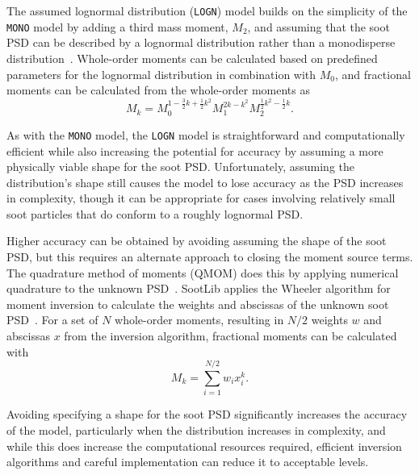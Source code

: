 \documentclass[preprint,letterpaper]{elsarticle}
\begin{document}

The assumed lognormal distribution (\texttt{LOGN}) model builds on the simplicity of the \texttt{MONO} model by adding a third mass moment, $M_2$, and assuming that the soot PSD can be described by a lognormal distribution rather than a monodisperse distribution~\cite{Lignell_2008b}. Whole-order moments can be calculated based on predefined parameters for the lognormal distribution in combination with $M_0$, and fractional moments can be calculated from the whole-order moments as
\begin{equation}
    M_k = M_0^{1-\frac{3}{2}k+\frac{1}{2}k^2} M_1^{2k-k^2} M_2^{\frac{1}{2}k^2-\frac{1}{2}k}.
\end{equation}

As with the \texttt{MONO} model, the \texttt{LOGN} model is straightforward and computationally efficient while also increasing the potential for accuracy by assuming a more physically viable shape for the soot PSD. Unfortunately, assuming the distribution's shape still causes the model to lose accuracy as the PSD increases in complexity, though it can be appropriate for cases involving relatively small soot particles that do conform to a roughly lognormal PSD.


Higher accuracy can be obtained by avoiding assuming the shape of the soot PSD, but this requires an alternate approach to closing the moment source terms. The quadrature method of moments (QMOM) does this by applying numerical quadrature to the unknown PSD~\cite{McGraw_1997}. SootLib applies the Wheeler algorithm for moment inversion to calculate the weights and abscissas of the unknown soot PSD~\cite{Marchisio_2013,Wheeler_1974}. For a set of $N$ whole-order moments, resulting in $N/2$ weights $w$ and abscissas $x$ from the inversion algorithm, fractional moments can be calculated with
\begin{equation}
    M_k = \sum_{i=1}^{N/2} w_i x_i^k.
\end{equation}

Avoiding specifying a shape for the soot PSD significantly increases the accuracy of the model, particularly when the distribution increases in complexity, and while this does increase the computational resources required, efficient inversion algorithms and careful implementation can reduce it to acceptable levels.
\end{document}

